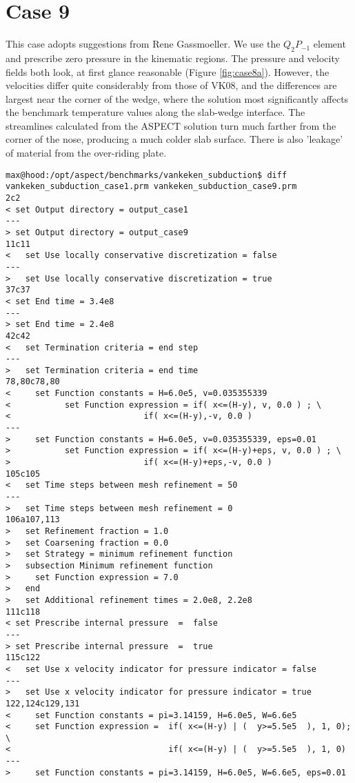 \documentclass[11pt,letterpaper]{article}
\begin{document}
\section{Case 9}
This case adopts suggestions from Rene Gassmoeller. We use the $Q_2 P_{-1}$ element and prescribe zero pressure in the kinematic regions. The pressure and velocity fields both look, at first glance reasonable (Figure \ref{fig:case8a}). However, the velocities differ quite considerably from those of VK08, and the differences are largest near the corner of the wedge, where the solution most significantly affects the benchmark temperature values along the slab-wedge interface. The streamlines calculated from the ASPECT solution turn much farther from the corner of the nose, producing a much colder slab surface. There is also 'leakage' of material from the over-riding plate.
\begin{verbatim}
max@hood:/opt/aspect/benchmarks/vankeken_subduction$ diff vankeken_subduction_case1.prm vankeken_subduction_case9.prm 
2c2
< set Output directory = output_case1
---
> set Output directory = output_case9
11c11
<   set Use locally conservative discretization = false
---
>   set Use locally conservative discretization = true
37c37
< set End time = 3.4e8
---
> set End time = 2.4e8
42c42
<   set Termination criteria = end step
---
>   set Termination criteria = end time
78,80c78,80
< 	  set Function constants = H=6.0e5, v=0.035355339
<           set Function expression = if( x<=(H-y), v, 0.0 ) ; \
< 	      	       		    if( x<=(H-y),-v, 0.0 )
---
> 	  set Function constants = H=6.0e5, v=0.035355339, eps=0.01
>           set Function expression = if( x<=(H-y)+eps, v, 0.0 ) ; \
> 	      	       		    if( x<=(H-y)+eps,-v, 0.0 )
105c105
<   set Time steps between mesh refinement = 50
---
>   set Time steps between mesh refinement = 0
106a107,113
>   set Refinement fraction = 1.0
>   set Coarsening fraction = 0.0
>   set Strategy = minimum refinement function
>   subsection Minimum refinement function
>     set Function expression = 7.0
>   end	     
>   set Additional refinement times = 2.0e8, 2.2e8
111c118
< set Prescribe internal pressure  =  false
---
> set Prescribe internal pressure  =  true
115c122
<   set Use x velocity indicator for pressure indicator = false
---
>   set Use x velocity indicator for pressure indicator = true
122,124c129,131
<     set Function constants = pi=3.14159, H=6.0e5, W=6.6e5
<     set Function expression =  if( x<=(H-y) | (  y>=5.5e5  ), 1, 0); \
<                                if( x<=(H-y) | (  y>=5.5e5  ), 1, 0)
---
>     set Function constants = pi=3.14159, H=6.0e5, W=6.6e5, eps=0.01

\end{verbatim}
\end{document}
